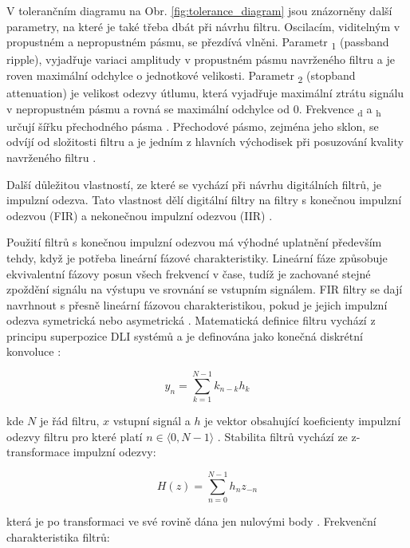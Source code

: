 V tolerančním diagramu na Obr. \ref{fig:tolerance_diagram} jsou znázorněny
další parametry, na které je také třeba dbát při návrhu filtru. Oscilacím,
viditelným v propustném a nepropustném pásmu, se přezdívá vlněni. Parametr
\textdelta \textsubscript{1} (passband ripple), vyjadřuje variaci amplitudy v
propustném pásmu navrženého filtru a je roven maximální odchylce o jednotkové
velikosti. Parametr \textdelta \textsubscript{2} (stopband attenuation) je
velikost odezvy útlumu, která vyjadřuje maximální ztrátu signálu v nepropustném
pásmu a rovná se maximální odchylce od 0. Frekvence \textomega \textsubscript{d}
a \textomega \textsubscript{h} určují šířku přechodného pásma
\cite{Prchal2000,Lyons1997}. Přechodové pásmo, zejména jeho sklon, se odvíjí od
složitosti filtru a je jedním z hlavních východisek při posuzování kvality
navrženého filtru \cite{Jan2002}.

Další důležitou vlastností, ze které se vychází při návrhu digitálních filtrů,
je impulzní odezva. Tato vlastnost dělí digitální filtry na filtry s konečnou
impulzní odezvou (FIR) a nekonečnou impulzní odezvou (IIR) \cite{Skop1994}.

Použití filtrů s konečnou impulzní odezvou má výhodné uplatnění především tehdy,
když je potřeba lineární fázové charakteristiky. Lineární fáze způsobuje
ekvivalentní fázovy posun všech frekvencí v čase, tudíž je zachované stejné
zpoždění signálu na výstupu ve srovnání se vstupním signálem. FIR filtry se dají
navrhnout s přesně lineární fázovou charakteristikou, pokud je jejich impulzní
odezva symetrická nebo asymetrická \cite{Prchal2000}. Matematická definice
filtru vychází z principu superpozice DLI systémů a je definována jako konečná
diskrétní konvoluce \cite{Jan2002}:

\begin{equation}
	\label{eq:conv_fir}
	y_n = \sum_{k=1}^{N-1} k_{n-k} h_k
\end{equation}

kde $N$ je řád filtru, $x$ vstupní signál a $h$ je vektor obsahující koeficienty
impulzní odezvy filtru pro které platí $n \in \langle 0,N-1 \rangle$
\cite{Jan2002}. Stabilita filtrů vychází ze z-transformace impulzní odezvy:

\begin{equation}
	\label{eq:transfer_fir}
	H(z) = \sum_{n=0}^{N-1} h_n z_{-n}
\end{equation}

která je po transformaci ve své rovině dána jen nulovými body \cite{Jan2002}.
Frekvenční charakteristika filtrů:

